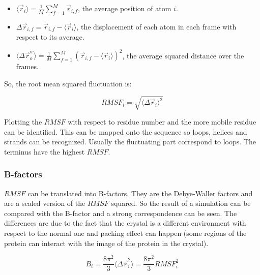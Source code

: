 	\begin{itemize}
		\item $\langle \vec{r}_i\rangle = \frac{1}{M}\sum\limits_{f=1}^M\vec{r}_{i,f}$, the average position of atom $i$.
		\item $\Delta\vec{r}_{i,f} = \vec{r}_{i,f}-\langle\vec{r}_i\rangle$, the displacement of each atom in each frame with respect to its average.
		\item $\langle \Delta\vec{r}_o^w\rangle = \frac{1}{M}\sum\limits_{f=1}^M(\vec{r}_{i,f}-\langle\vec{r}_i\rangle)^2$, the average squared distance over the frames.
	\end{itemize}

	So, the root mean squared fluctuation is:

	$$RMSF_i = \sqrt{\langle\Delta\vec{r}_i\rangle^2}$$

	Plotting the $RMSF$ with respect to residue number and the more mobile residue can be identified.
	This can be mapped onto the sequence so loops, helices and strands can be recognized.
	Usually the fluctuating part correspond to loops.
	The terminus have the highest $RMSF$.

		\subsubsection{B-factors}
		$RMSF$ can be translated into B-factors.
		They are the Debye-Waller factors and are a scaled version of the $RMSF$ squared.
		So the result of a simulation can be compared with the B-factor and a strong correspondence can be seen.
		The differences are due to the fact that the crystal is a different environment with respect to the normal one and packing effect can happen (some regions of the protein can interact with the image of the protein in the crystal).

		$$B_i = \frac{8\pi^2}{3}\langle\Delta\vec{r}_i^2\rangle = \frac{8\pi^2}{3}RMSF^2_i$$
